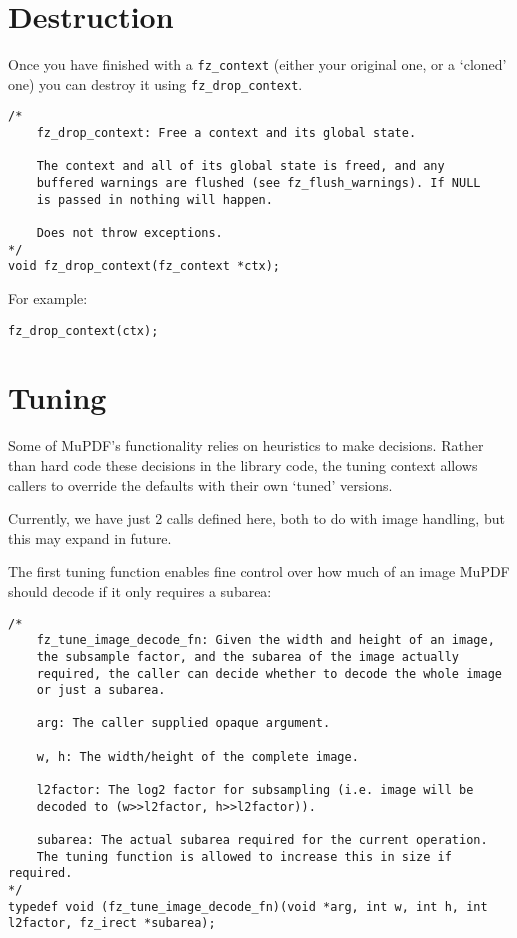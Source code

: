 \documentclass[oneside]{book}
\begin{document}
\section{Destruction}

Once you have finished with a \texttt{fz\_context} (either your original one, or a `cloned' one) you can destroy it using \texttt{fz\_drop\_context}.

\begin{lstlisting}
/*
	fz_drop_context: Free a context and its global state.

	The context and all of its global state is freed, and any
	buffered warnings are flushed (see fz_flush_warnings). If NULL
	is passed in nothing will happen.

	Does not throw exceptions.
*/
void fz_drop_context(fz_context *ctx);
\end{lstlisting}

For example:

\begin{lstlisting}
fz_drop_context(ctx);
\end{lstlisting}

\section{Tuning}
\label{Tuning}

Some of MuPDF's functionality relies on heuristics to make decisions. Rather than hard code these decisions in the library code, the tuning context allows callers to override the defaults with their own `tuned' versions.

Currently, we have just 2 calls defined here, both to do with image handling, but this may expand in future.

The first tuning function enables fine control over how much of an image MuPDF should decode if it only requires a subarea:

\begin{lstlisting}
/*
	fz_tune_image_decode_fn: Given the width and height of an image,
	the subsample factor, and the subarea of the image actually
	required, the caller can decide whether to decode the whole image
	or just a subarea.

	arg: The caller supplied opaque argument.

	w, h: The width/height of the complete image.

	l2factor: The log2 factor for subsampling (i.e. image will be
	decoded to (w>>l2factor, h>>l2factor)).

	subarea: The actual subarea required for the current operation.
	The tuning function is allowed to increase this in size if required.
*/
typedef void (fz_tune_image_decode_fn)(void *arg, int w, int h, int l2factor, fz_irect *subarea);
\end{lstlisting}
\end{document}
